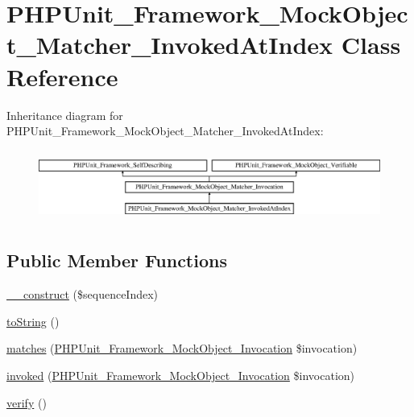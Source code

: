 \hypertarget{class_p_h_p_unit___framework___mock_object___matcher___invoked_at_index}{}\section{P\+H\+P\+Unit\+\_\+\+Framework\+\_\+\+Mock\+Object\+\_\+\+Matcher\+\_\+\+Invoked\+At\+Index Class Reference}
\label{class_p_h_p_unit___framework___mock_object___matcher___invoked_at_index}
Inheritance diagram for P\+H\+P\+Unit\+\_\+\+Framework\+\_\+\+Mock\+Object\+\_\+\+Matcher\+\_\+\+Invoked\+At\+Index\+:\begin{figure}[H]
\begin{center}
\leavevmode
\includegraphics[height=2.346369cm]{class_p_h_p_unit___framework___mock_object___matcher___invoked_at_index}
\end{center}
\end{figure}
\subsection*{Public Member Functions}
\begin{DoxyCompactItemize}
\item 
\mbox{\hyperlink{class_p_h_p_unit___framework___mock_object___matcher___invoked_at_index_ac7f411a76ef452f4d11bd5657cedd730}{\+\_\+\+\_\+construct}} (\$sequence\+Index)
\item 
\mbox{\hyperlink{class_p_h_p_unit___framework___mock_object___matcher___invoked_at_index_a5558c5d549f41597377fa1ea8a1cefa3}{to\+String}} ()
\item 
\mbox{\hyperlink{class_p_h_p_unit___framework___mock_object___matcher___invoked_at_index_a4988c6fa11e275302172d0a4ae32dd3a}{matches}} (\mbox{\hyperlink{interface_p_h_p_unit___framework___mock_object___invocation}{P\+H\+P\+Unit\+\_\+\+Framework\+\_\+\+Mock\+Object\+\_\+\+Invocation}} \$invocation)
\item 
\mbox{\hyperlink{class_p_h_p_unit___framework___mock_object___matcher___invoked_at_index_a63f37b06181c9547bc3c225007c34425}{invoked}} (\mbox{\hyperlink{interface_p_h_p_unit___framework___mock_object___invocation}{P\+H\+P\+Unit\+\_\+\+Framework\+\_\+\+Mock\+Object\+\_\+\+Invocation}} \$invocation)
\item 
\mbox{\hyperlink{class_p_h_p_unit___framework___mock_object___matcher___invoked_at_index_aa33600b6a1b28d0c4dfe4d468272aaa4}{verify}} ()
\end{DoxyCompactItemize}
